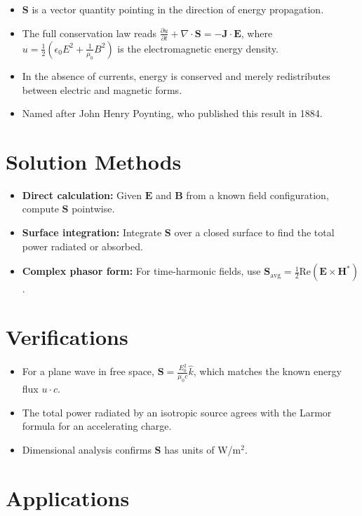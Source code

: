 \documentclass[11pt,openright]{book}
\begin{document}
\begin{itemize}
    \item $\mathbf{S}$ is a vector quantity pointing in the direction of energy propagation.
    \item The full conservation law reads $\frac{\partial u}{\partial t} + \nabla \cdot \mathbf{S} = -\mathbf{J} \cdot \mathbf{E}$, where $u = \frac{1}{2}(\epsilon_0 E^2 + \frac{1}{\mu_0}B^2)$ is the electromagnetic energy density.
    \item In the absence of currents, energy is conserved and merely redistributes between electric and magnetic forms.
    \item Named after John Henry Poynting, who published this result in 1884.
\end{itemize}
\section*{Solution Methods}

\begin{itemize}
    \item \textbf{Direct calculation:} Given $\mathbf{E}$ and $\mathbf{B}$ from a known field configuration, compute $\mathbf{S}$ pointwise.
    \item \textbf{Surface integration:} Integrate $\mathbf{S}$ over a closed surface to find the total power radiated or absorbed.
    \item \textbf{Complex phasor form:} For time-harmonic fields, use $\mathbf{S}_{\text{avg}} = \frac{1}{2}\text{Re}(\mathbf{E} \times \mathbf{H}^*)$.
\end{itemize}
\section*{Verifications}

\begin{itemize}
    \item For a plane wave in free space, $\mathbf{S} = \frac{E_0^2}{\mu_0 c}\hat{k}$, which matches the known energy flux $u \cdot c$.
    \item The total power radiated by an isotropic source agrees with the Larmor formula for an accelerating charge.
    \item Dimensional analysis confirms $\mathbf{S}$ has units of W/m$^2$.
\end{itemize}
\section*{Applications}
\end{document}
